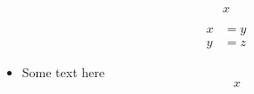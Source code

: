 \[
  x
\]

\[
  \begin{split}
    x &= y \\
    y &= z
  \end{split}
\]

\begin{itemize}
\item Some text here
  \[
    x
  \]
\end{itemize}
